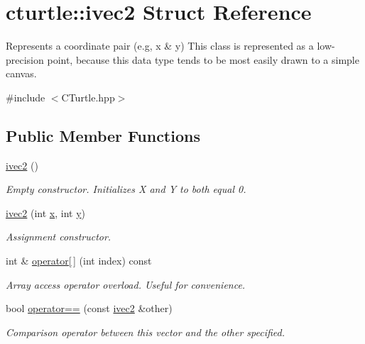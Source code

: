 \hypertarget{structcturtle_1_1ivec2}{}\section{cturtle\+:\+:ivec2 Struct Reference}
\label{structcturtle_1_1ivec2}


Represents a coordinate pair (e.\+g, x \& y) This class is represented as a low-\/precision point, because this data type tends to be most easily drawn to a simple canvas.  




{\ttfamily \#include $<$C\+Turtle.\+hpp$>$}

\subsection*{Public Member Functions}
\begin{DoxyCompactItemize}
\item 
\mbox{\label{structcturtle_1_1ivec2_a98b74bd6df906a25ef700397d6190103}} 
\hyperlink{structcturtle_1_1ivec2_a98b74bd6df906a25ef700397d6190103}{ivec2} ()
\begin{DoxyCompactList}\small\item\em Empty constructor. Initializes X and Y to both equal 0. \end{DoxyCompactList}\item 
\hyperlink{structcturtle_1_1ivec2_a7069d9f7c5ef7505c7c00c55958e0982}{ivec2} (int \hyperlink{structcturtle_1_1ivec2_acf8e72e8e3847b3a62f35bfbe588b637}{x}, int \hyperlink{structcturtle_1_1ivec2_a20914f8516f2f9b8e88e81cdf8415897}{y})
\begin{DoxyCompactList}\small\item\em Assignment constructor. \end{DoxyCompactList}\item 
int \& \hyperlink{structcturtle_1_1ivec2_a83c6a5b1aab3c9a0a2374c843198067f}{operator\mbox{[}$\,$\mbox{]}} (int index) const
\begin{DoxyCompactList}\small\item\em Array access operator overload. Useful for convenience. \end{DoxyCompactList}\item 
\mbox{\label{structcturtle_1_1ivec2_ab564fda10817a6e06b80b205f9833dee}} 
bool \hyperlink{structcturtle_1_1ivec2_ab564fda10817a6e06b80b205f9833dee}{operator==} (const \hyperlink{structcturtle_1_1ivec2}{ivec2} \&other)
\begin{DoxyCompactList}\small\item\em Comparison operator between this vector and the other specified. \end{DoxyCompactList}\end{DoxyCompactItemize}
